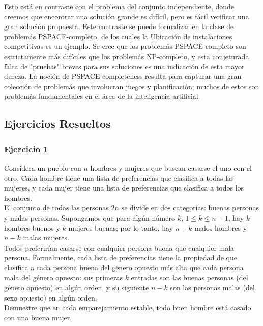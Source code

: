 \documentclass[a4paper]{article}
\begin{document}
Esto está en contraste con el problema del conjunto independiente, donde creemos que encontrar una solución grande es difícil, pero es fácil verificar una gran solución propuesta. Este contraste se puede formalizar en la clase de problemás PSPACE-completo, de los cuales la Ubicación de instalaciones competitivas es un ejemplo. Se cree que los problemás PSPACE-completo son estrictamente más difíciles que los problemás NP-completo, y esta conjeturada falta de "pruebas" breves para sus soluciones es una indicación de esta mayor dureza. La noción de PSPACE-completeness resulta para capturar una gran colección de problemás que involucran juegos y planificación; muchos de estos son problemás fundamentales en el área de la inteligencia artificial.\\

\subsection{Ejercicios Resueltos}

\subsubsection*{Ejercicio 1}

Considera un pueblo con $n$ hombres y mujeres que buscan casarse el uno con el otro. Cada hombre tiene una lista de preferencias que clasifica a todas las mujeres, y cada mujer tiene una lista de preferencias que clasifica a todos los hombres.\\

El conjunto de todas las personas $2n$ se divide en dos categorías: buenas personas y malas personas. Supongamos que para algún número $k$, $1≤k≤n-1$, hay $k$ hombres buenos y $k$ mujeres buenas; por lo tanto, hay $n-k$ malos hombres y $n-k$ malas mujeres.\\

Todos preferirían casarse con cualquier persona buena que cualquier mala persona. Formalmente, cada lista de preferencias tiene la propiedad de que clasifica a cada persona buena del género opuesto más alta que cada persona mala del género opuesto: sus primeras $k$ entradas son las buenas personas (del género opuesto) en algún orden, y su siguiente $n-k$ son las personas malas (del sexo opuesto) en algún orden.\\

Demuestre que en cada emparejamiento estable, todo buen hombre está casado con una buena mujer.\\
\end{document}
